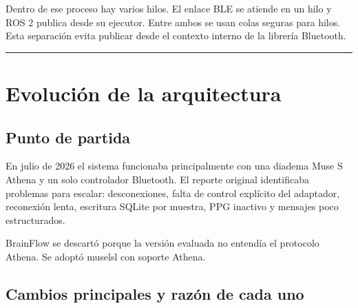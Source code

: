 \documentclass[11pt,a4paper]{article}
\begin{document}
Dentro de ese proceso hay varios hilos. El enlace BLE se atiende en un hilo y ROS 2 publica desde su ejecutor. Entre ambos se usan colas seguras para hilos. Esta separación evita publicar desde el contexto interno de la librería Bluetooth.

\medskip\hrule\medskip

\section{Evolución de la arquitectura}

\subsection{Punto de partida}

En julio de 2026 el sistema funcionaba principalmente con una diadema Muse S Athena y un solo controlador Bluetooth. El reporte original identificaba problemas para escalar: desconexiones, falta de control explícito del adaptador, reconexión lenta, escritura SQLite por muestra, PPG inactivo y mensajes poco estructurados.

BrainFlow se descartó porque la versión evaluada no entendía el protocolo Athena. Se adoptó {\ttfamily\small muselsl} con soporte Athena.

\subsection{Cambios principales y razón de cada uno}
\end{document}
